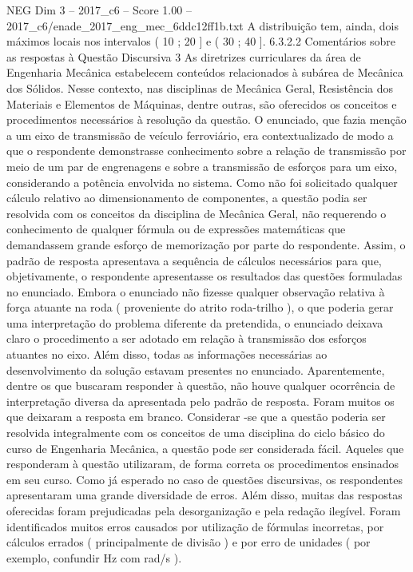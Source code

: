 \begin{textsample}{NEG Dim 3 – 2017\_c6 – Score 1.00 – 2017\_c6/enade\_2017\_eng\_mec\_6ddc12ff1b.txt}
A distribuição tem, ainda, dois máximos locais nos intervalos ( 10 ; 20 ] e ( 30 ; 40 ]. 6.3.2.2 Comentários sobre as respostas à Questão Discursiva 3 As diretrizes curriculares da área de Engenharia Mecânica estabelecem conteúdos relacionados à subárea de Mecânica dos Sólidos.
Nesse contexto, nas disciplinas de Mecânica Geral, Resistência dos Materiais e Elementos de Máquinas, dentre outras, são oferecidos os conceitos e procedimentos necessários à resolução da questão.
O enunciado, que fazia menção a um eixo de transmissão de veículo ferroviário, era contextualizado de modo a que o respondente demonstrasse conhecimento sobre a relação de transmissão por meio de um par de engrenagens e sobre a transmissão de esforços para um eixo, considerando a potência envolvida no sistema.
Como não foi solicitado qualquer cálculo relativo ao dimensionamento de componentes, a questão podia ser resolvida com os conceitos da disciplina de Mecânica Geral, não requerendo o conhecimento de qualquer fórmula ou de expressões matemáticas que demandassem grande esforço de memorização por parte do respondente.
Assim, o padrão de resposta apresentava a sequência de cálculos necessários para que, objetivamente, o respondente apresentasse os resultados das questões formuladas no enunciado.
Embora o enunciado não fizesse qualquer observação relativa à força atuante na roda ( proveniente do atrito roda-trilho ), o que poderia gerar uma interpretação do problema diferente da pretendida, o enunciado deixava claro o procedimento a ser adotado em relação à transmissão dos esforços atuantes no eixo.
Além disso, todas as informações necessárias ao desenvolvimento da solução estavam presentes no enunciado.
Aparentemente, dentre os que buscaram responder à questão, não houve qualquer ocorrência de interpretação diversa da apresentada pelo padrão de resposta.
Foram muitos os que deixaram a resposta em branco.
Considerar -se que a questão poderia ser resolvida integralmente com os conceitos de uma disciplina do ciclo básico do curso de Engenharia Mecânica, a questão pode ser considerada fácil.
Aqueles que responderam à questão utilizaram, de forma correta os procedimentos ensinados em seu curso.
Como já esperado no caso de questões discursivas, os respondentes apresentaram uma grande diversidade de erros.
Além disso, muitas das respostas oferecidas foram prejudicadas pela desorganização e pela redação ilegível.
Foram identificados muitos erros causados por utilização de fórmulas incorretas, por cálculos errados ( principalmente de divisão ) e por erro de unidades ( por exemplo, confundir Hz com rad/s ).

\end{textsample}
